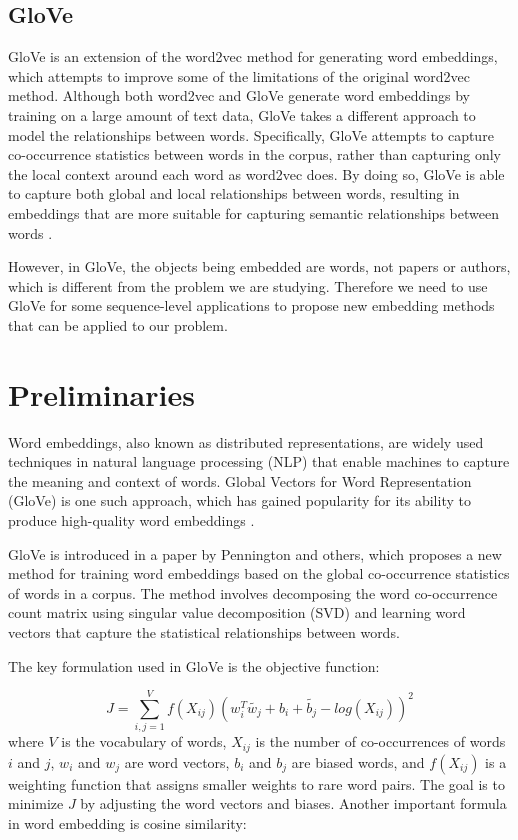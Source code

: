 \documentclass[a4paper]{jpconf}
\begin{document}
\subsection{GloVe}
GloVe \cite{GloVe} is an extension of the word2vec method for
generating word embeddings, which attempts to improve some of the
limitations of the original word2vec method. Although both word2vec and
GloVe generate word embeddings \cite{https://doi.org/10.48550/arxiv.2301.10656} by training on a large amount of text
data, GloVe takes a different approach to model the relationships
between words. Specifically, GloVe attempts to capture co-occurrence
statistics between words in the corpus, rather than capturing only the
local context around each word as word2vec does. By doing so, GloVe is
able to capture both global and local relationships between words,
resulting in embeddings that are more suitable for capturing semantic
relationships between words \cite{7478417}.

However, in GloVe, the objects being embedded are words, not papers
or authors, which is different from the problem we are studying.
Therefore we need to use GloVe for some sequence-level applications to
propose new embedding methods that can be applied to our problem.




\section{Preliminaries}
Word embeddings, also known as distributed representations, are widely
used techniques in natural language processing (NLP) that enable
machines to capture the meaning and context of words. Global Vectors for
Word Representation (GloVe) is one such approach, which has gained
popularity for its ability to produce high-quality word embeddings \cite{8861084}.

GloVe is introduced in a paper by Pennington and others, which proposes a new method for training word
embeddings based on the global co-occurrence statistics of words in a
corpus. The method involves decomposing the word co-occurrence count
matrix using singular value decomposition (SVD) and learning word
vectors that capture the statistical relationships between words.

The key formulation used in GloVe is the objective function:

\begin{equation}\label{eq:J}
    J = \sum_{i,j=1}^{V}f(X_{ij})(w_i^T \tilde{w_j} + b_i + \tilde{b_j} - log(X_{ij}))^2
\end{equation}
where \(V\) is the vocabulary of words, \(X_{ij}\) is the number of
co-occurrences of words \(i\) and \(j\), \(w_i\) and \(w_j\) are word
vectors, \(b_i\) and \(b_j\) are biased words, and \(f(X_{ij})\) is a
weighting function that assigns smaller weights to rare word pairs. The
goal is to minimize \(J\) by adjusting the word vectors and biases.
Another important formula in word embedding is cosine similarity:
\end{document}
